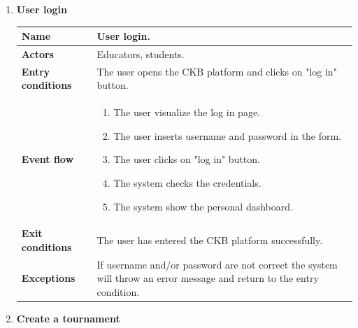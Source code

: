 \begin{enumerate}[label=\textbf{UC.\arabic*}]
\begin{table}[H]
\begin{tabular}{|m{3.2cm}|m{9.8cm}|}
                \end{tabular}
        \end{table}
        \item {} \textbf{User login}
        \begin{table}[H]
    	    \centering
                \renewcommand{\arraystretch}{1.5}
                \begin{tabular}{|m{3.2cm}|m{9.8cm}|}
                    \hline
                    \textbf{Name} & User login.\\
                    \hline
                    \textbf{Actors} &  Educators, students. \\
                    \hline
                    \textbf{Entry conditions}  & The user opens the CKB platform and clicks on "log in" button. \\
                    \hline
                    \textbf{Event flow}  & 
                    \begin{enumerate}[label=\arabic*.]
                        \item The user visualize the log in page.
                        \item The user inserts username and password in the form.
                        \item The user clicks on "log in" button.
                        \item The system checks the credentials.
                        \item The system show the personal dashboard.
                    \end{enumerate}\\
                    \hline
                    \textbf{Exit conditions}  & The user has entered the CKB platform successfully. \\
                    \hline
                    \textbf{Exceptions}  & If username and/or password are not correct the system will throw an error message and return to the entry condition. \\
                    \hline 
                \end{tabular}
        \end{table}
        \item {} \textbf{Create a tournament}
        \begin{table}[H]
    	    \centering
                \renewcommand{\arraystretch}{1.5}
                \begin{tabular}{|m{3.2cm}|m{9.8cm}|}
                    \hline

\end{tabular}
\end{table}
\end{enumerate}

